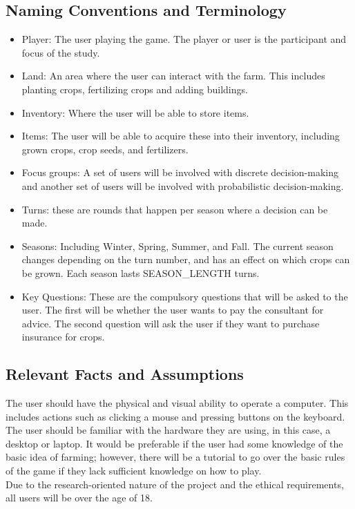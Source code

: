 \documentclass{article}
\begin{document}
\subsection{Naming Conventions and Terminology}
\begin{itemize}
  \item Player: The user playing the game. The player or user is the participant and focus of the study.
  \item Land: An area where the user can interact with the farm. This includes planting crops, fertilizing crops and adding buildings.
  \item Inventory: Where the user will be able to store items.
  \item Items: The user will be able to acquire these into their inventory, including grown crops, crop seeds, and fertilizers.
  \item Focus groups: A set of users will be involved with discrete decision-making and another set of users will be involved with probabilistic decision-making.
  \item Turns: these are rounds that happen per season where a decision can be made. 
  \item Seasons: Including Winter, Spring, Summer, and Fall. The current season changes depending on the turn number, and has an effect on which crops can be grown. Each season lasts SEASON\_LENGTH turns.
  \item Key Questions: These are the compulsory questions that will be asked to the user. The first will be whether the user wants to pay the consultant for advice. The second question will ask the user if they want to purchase insurance for crops.
\end{itemize}

\subsection{Relevant Facts and Assumptions}

The user should have the physical and visual ability to operate a computer. 
This includes actions such as clicking a mouse and pressing buttons on the keyboard. 
The user should be familiar with the hardware they are using, in this case, a desktop or laptop. 
It would be preferable if the user had some knowledge of the basic idea of farming; however, there 
will be a tutorial to go over the basic rules of the game if they lack sufficient knowledge on how to play. 
\\ Due to the research-oriented nature of the project and the ethical requirements, all users will be over the age of 18.
\end{document}
